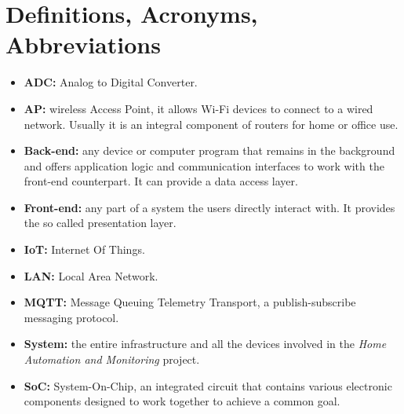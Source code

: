 \section{Definitions, Acronyms, Abbreviations}

\begin{itemize}
	\item \textbf{ADC:} Analog to Digital Converter.
	\item \textbf{AP:} wireless Access Point, it allows Wi-Fi devices to connect to a wired network. Usually it is an integral component of routers for home or office use.
	\item \textbf{Back-end:} any device or computer program that remains in the background and offers application logic and communication interfaces to work with the front-end counterpart. It can provide a data access layer.
	\item \textbf{Front-end:} any part of a system the users directly interact with. It provides the so called presentation layer.
	\item \textbf{IoT:} Internet Of Things.
	\item \textbf{LAN:} Local Area Network.
	\item \textbf{MQTT:} Message Queuing Telemetry Transport, a publish-subscribe messaging protocol.
	\item \textbf{System:} the entire infrastructure and all the devices involved in the \textit{Home Automation and Monitoring} project.
	\item \textbf{SoC:} System-On-Chip, an integrated circuit that contains various electronic components designed to work together to achieve a common goal.
\end{itemize}